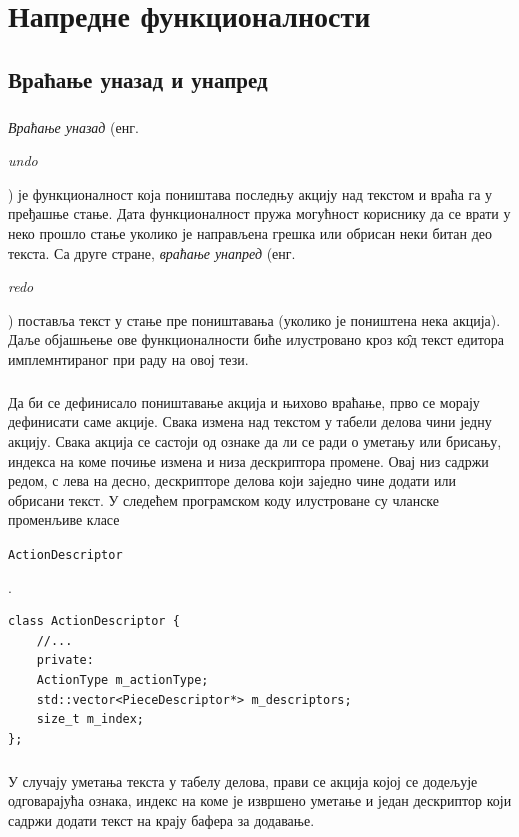 \documentclass[12pt,oneside]{memoir}
\begin{document}
\chapter{Напредне функционалности}
\section{Враћање уназад и унапред}
\paragraph{}
\emph{Враћање уназад} (енг. \begin{latinica}\textit{undo}\end{latinica}) је функционалност која поништава последњу акцију над текстом и враћа га у пређашње стање. Дата функционалност пружа могућност кориснику да се врати у неко прошло 
стање уколико је направљена грешка или обрисан неки битан део текста. Са друге
стране, \emph{враћање унапред} (енг. \begin{latinica}\textit{redo}\end{latinica})
поставља текст у стање пре поништавања (уколико је поништена нека акција).
Даље објашњење ове функционалности биће илустровано кроз к\^{о}д текст едитора 
имплемнтираног при раду на овој тези.

\paragraph{}
Да би се дефинисало поништавање акција и њихово враћање, прво се морају дефинисати саме акције. Свака измена над текстом у табели делова чини једну
акцију. Свака акција се састоји од ознаке да ли се ради о уметању или брисању,
индекса
на коме почиње измена и низа дескриптора промене. Овај низ садржи редом, 
с лева  на десно, дескрипторе делова који заједно чине додати или обрисани текст.
У следећем програмском коду илустроване су чланске променљиве класе 
\begin{latinica}\verb|ActionDescriptor|\end{latinica}.

\begin{verbatim}
class ActionDescriptor {
	//...
	private:
	ActionType m_actionType;
	std::vector<PieceDescriptor*> m_descriptors;
	size_t m_index;
};
\end{verbatim}


\paragraph{}
У случају уметања текста у табелу делова, прави се акција којој
се додељује одговарајућа ознака, индекс на коме је извршено уметање и
један дескриптор који садржи додати текст на крају бафера за додавање.
\end{document}
